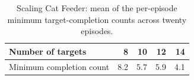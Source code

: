 \begin{table}[ht]
  \caption{Scaling Cat Feeder: mean of the per-episode minimum target-completion counts across twenty episodes.}
  \label{tab:scaling-coverage}
  \centering
  \begin{tabular}{lrrrr}
    \toprule
    Number of targets & 8 & 10 & 12 & 14 \\
    \midrule
    Minimum completion count & 8.2 & 5.7 & 5.9 & 4.1 \\
    \bottomrule
  \end{tabular}
\end{table}
